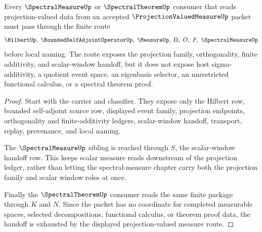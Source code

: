 \begin{theorem}
\label{thm:projection-valued-measure-spectral-measure-handoff}
Every $\SpectralMeasureUp$ or $\SpectralTheoremUp$ consumer that reads projection-valued data from an accepted $\ProjectionValuedMeasureUp$ packet must pass through the finite route
$$
\HilbertUp,\ \BoundedSelfAdjointOperatorUp,\ \MeasureUp,\ \Pi,\ O,\ F,\ \SpectralMeasureUp
$$
before local naming. The route exposes the projection family, orthogonality, finite additivity, and scalar-window handoff, but it does not expose host sigma-additivity, a quotient event space, an eigenbasis selector, an unrestricted functional calculus, or a spectral theorem proof.
\end{theorem}
\begin{proof}
Start with the carrier and classifier. They expose only the Hilbert row, bounded self-adjoint source row, displayed event family, projection endpoints, orthogonality and finite-additivity ledgers, scalar-window handoff, transport, replay, provenance, and local naming.

The $\SpectralMeasureUp$ sibling is reached through $S$, the scalar-window handoff row. This keeps scalar measure reads downstream of the projection ledger, rather than letting the spectral-measure chapter carry both the projection family and scalar window roles at once.

Finally the $\SpectralTheoremUp$ consumer reads the same finite package through $K$ and $N$. Since the packet has no coordinate for completed measurable spaces, selected decompositions, functional calculus, or theorem proof data, the handoff is exhausted by the displayed projection-valued measure route.
\end{proof}



